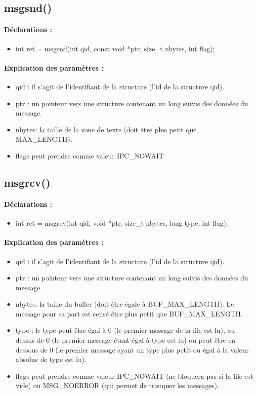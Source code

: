 \documentclass{article}[12pt]
\begin{document}
\subsection{msgsnd()}
\paragraph{Déclarations : }
\begin{itemize}
	\item int ret = msgsnd(int qid, const void *ptr, size\_t nbytes, int flag); 
\end{itemize}
\paragraph{Explication des paramètres : }
\begin{itemize}
\item qid : il s'agit de l'identifiant de la structure (l'id de la structure qid). 
\item ptr : un pointeur vers une structure contenant un long suivis des données du message.
\item nbytes: la taille de la zone de texte (doit être plus petit que MAX\_LENGTH).
\item flags peut prendre comme valeur IPC\_NOWAIT  
\end{itemize}
\subsection{msgrcv()}
\paragraph{Déclarations : }
\begin{itemize}
	\item int ret = msgrcv(int qid, void *ptr, size\_t nbytes, long type, int flag); 
\end{itemize}
\paragraph{Explication des paramètres : }
\begin{itemize}
\item qid : il s'agit de l'identifiant de la structure (l'id de la structure qid). 
\item ptr : un pointeur vers une structure contenant un long suivis des données du message.
\item nbytes: la taille du buffer (doit être égale à BUF\_MAX\_LENGTH). Le message pour sa part est censé être plus petit que BUF\_MAX\_LENGTH.
\item type : le type peut être égal à 0 (le premier message de la file est lu), au dessus de 0 (le premier message étant égal à type est lu) ou peut être en dessous de 0 (le premier message ayant un type plus petit ou égal à la valeur absolue de type est lu).
\item flags peut prendre comme valeur IPC\_NOWAIT (ne bloquera pas si la file est vide) ou MSG\_NOERROR (qui permet de tronquer les messages).
\end{itemize}
\end{document}
